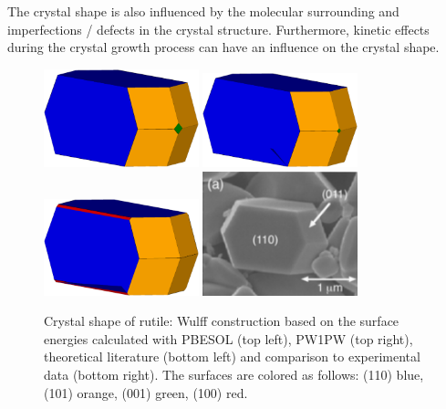 \documentclass[a4paper,12pt,parskip=half]{scrartcl}
\begin{document}
The crystal shape is also influenced by the molecular surrounding and imperfections / defects in the crystal structure. Furthermore, kinetic effects during the crystal growth process can have an influence on the crystal shape. 
%
\begin{figure}[H]
	\centering
	\includegraphics[width=0.4\textwidth]{wulff-pbesol.eps}
	\includegraphics[width=0.4\textwidth]{wulff-pw1pw.eps}
	\includegraphics[width=0.4\textwidth]{wulff-theo-lit.eps}
	\includegraphics[width=0.4\textwidth]{rutile_exp.png}
	\caption{Crystal shape of rutile: Wulff construction based on the surface energies calculated with PBESOL (top left), PW1PW (top right), theoretical literature\autocite[]{rutile-surface-energy} (bottom left) and comparison to experimental data\autocite[]{rutile-shape} (bottom right). The surfaces are colored as follows: (110) blue, (101) orange, (001) green, (100) red.}
	\label{fig:wulff}
\end{figure}
%
\newpage
\printbibliography[title={Literature}]
%
\end{document}
